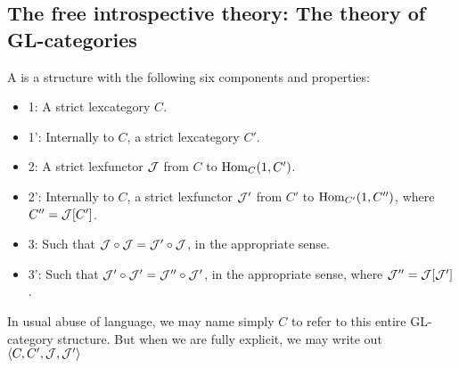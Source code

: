 \subsection{The free introspective theory: The theory of GL-categories}
\begin{definition}
A  is a structure with the following six components and properties:
\begin{itemize}
    \item 1: A strict lexcategory $C$.
    \item 1': Internally to $C$, a strict lexcategory $C'$.
    \item 2: A strict lexfunctor $\mathcal{J}$ from $C$ to $\operatorname{Hom}_C(1, C')$.
    \item 2': Internally to $C$, a strict lexfunctor $\mathcal{J}'$ from $C'$ to $\operatorname{Hom}_{C'}(1, C'')$, where $C'' = \mathcal{J}[C']$.
    \item 3: Such that $\mathcal{J} \circ \mathcal{J} = \mathcal{J}' \circ \mathcal{J}$, in the appropriate sense.
    \item 3': Such that $\mathcal{J}' \circ \mathcal{J}' = \mathcal{J}'' \circ \mathcal{J}'$, in the appropriate sense, where $\mathcal{J}'' = \mathcal{J}[\mathcal{J}']$.
\end{itemize}
In usual abuse of language, we may name simply $C$ to refer to this entire GL-category structure. But when we are fully explicit, we may write out $\langle C, C', \mathcal{J}, \mathcal{J}' \rangle$
\end{definition}

